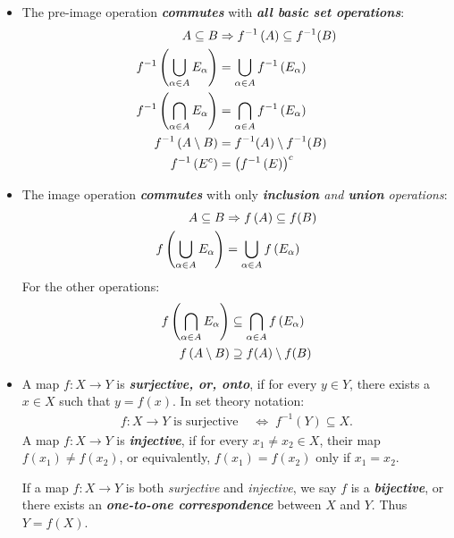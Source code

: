 \documentclass[11pt]{article}
\begin{document}
\begin{itemize}
\item \begin{remark}
The pre-image operation \emph{\textbf{commutes}} with \emph{\textbf{all basic set operations}}:
\begin{align*}
A \subseteq B & \Rightarrow f^{-1}\left(A\right) \subseteq f^{-1}(B) \\
f^{-1}\left(\bigcup_{\alpha \in A}E_{\alpha}\right) &= \bigcup_{\alpha \in A}f^{-1}\left(E_{\alpha}\right)\\
f^{-1}\left(\bigcap_{\alpha \in A}E_{\alpha}\right) &= \bigcap_{\alpha \in A}f^{-1}\left(E_{\alpha}\right)\\
f^{-1}\left(A \setminus B\right) &= f^{-1}(A) \setminus f^{-1}(B) \\
f^{-1}\left(E^c\right) &= \left(f^{-1}\left(E\right)\right)^c 
\end{align*}
\end{remark}


\item \begin{remark}
The image operation \emph{\textbf{commutes}} with only  \emph{\textbf{inclusion} and \textbf{union} operations}:
\begin{align*}
A \subseteq B & \Rightarrow f\left(A\right) \subseteq f(B) \\
f\left(\bigcup_{\alpha \in A}E_{\alpha}\right) &= \bigcup_{\alpha \in A}f\left(E_{\alpha}\right) 
\end{align*} For the other operations:
\begin{align*}
f\left(\bigcap_{\alpha \in A}E_{\alpha}\right) &\subseteq \bigcap_{\alpha \in A}f\left(E_{\alpha}\right) \\
f\left(A \setminus B\right) &\supseteq f(A) \setminus f(B)
\end{align*}
\end{remark}

\item \begin{definition}
A map $f: X\rightarrow Y$ is \emph{\textbf{surjective, or, onto}}, if for every $y \in Y$, there exists a $x \in X$ such that $y = f(x)$. In set theory notation:
\begin{align*}
f: X\rightarrow Y \text{ is surjective }&\Leftrightarrow \; f^{-1}(Y) \subseteq X.
\end{align*}
A map $f: X\rightarrow Y$ is \emph{\textbf{injective}}, if for every $x_1 \neq x_2 \in X$, their map $f(x_1) \neq f(x_2)$, or equivalently, $f(x_1) = f(x_2)$ only if $x_1 = x_2$.

If a map $f: X\rightarrow Y$ is both \emph{surjective} and \emph{injective}, we say $f$ is a \emph{\textbf{bijective}}, or there exists an \emph{\textbf{one-to-one correspondence}} between $X$ and $Y$. Thus $Y = f(X)$.
\end{definition}


\end{itemize}
\end{document}
